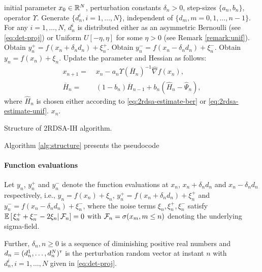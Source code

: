 \documentclass[letterpaper, 10 pt, conference]{ieeeconf}  %
\begin{document}
\begin{algorithm}[t]
\begin{algorithmic}
initial parameter $x_0 \in \mathbb{R}^N$, perturbation constants $\delta_n>0$, step-sizes $\{a_n, b_n\}$, operator $\Upsilon$.
	\State Generate $\{d_n^{i}, i=1,\ldots,N\}$, independent of $\{d_m, m=0,1,\ldots,n-1\}$. 
	\State For any $i=1,\ldots,N$, $d_n^{i}$ is distributed either as an asymmetric Bernoulli (see \eqref{eq:det-proj}) or Uniform $U[-\eta,\eta]$ for some $\eta >0$ (see Remark \ref{remark:unif}). 
	\PEval
	    \State Obtain $y_n^+ = f(x_n+\delta_n d_n) + \xi_n^+$.
  \EndPEval
	    \PEvalPrime
	    \State Obtain $y_n^- = f(x_n-\delta_n d_n) + \xi_n^-$.
	    \EndPEvalPrime
	    	    \PEvalPrimeDouble
	    \State Obtain $y_n = f(x_n) + \xi_n$.
	    \EndPEvalPrimeDouble
	    \PImpNewton
		\State Update the parameter and Hessian as follows:
		\begin{align*}
		x_{n+1} = & \; x_n - a_n \Upsilon(\overline H_n)^{-1}\widehat\nabla f(x_n), \\
\overline H_n = &\; (1-b_{n})  \overline H_{n-1} + b_{n} ( \widehat H_n - \widehat \Psi_n),
\end{align*}
where $\widehat H_n$ is chosen either according to \eqref{eq:2rdsa-estimate-ber} or \eqref{eq:2rdsa-estimate-unif}.
		\EndPImpNewton
\EndFor
{} $x_n.$
\end{algorithmic}
\caption{Structure of 2RDSA-IH algorithm.}
\label{alg:structure}
\end{algorithm}

Algorithm \ref{alg:structure} presents the pseudocode
\paragraph{\textbf{Function evaluations}}
Let $y_n$, $y_n^+$ and $y_n^-$ denote the function evaluations at $x_n$, $x_n+\delta_n d_n$ and $x_n - \delta_n d_n$ respectively, i.e., 
$y_n = f(x_n) + \xi_n$, $y_n^+ = f(x_n+\delta_n d_n) + \xi_n^+$ and 
$y_n^- = f(x_n-\delta_n d_n) + \xi_n^-$,
where the noise terms $\xi_n, \xi_n^+, \xi_n^-$ satisfy $\mathbb{E}\left[\left.\xi_n^+ + \xi_n^- - 2\xi_n \right| \mathcal{F}_n\right] = 0$ with $\mathcal{F}_n = \sigma(x_m,m\le n)$ denoting the underlying sigma-field.

Further, $\delta_n, n\geq 0$ is a sequence of diminishing positive real numbers and $d_n = (d_n^1,\ldots,d_n^N)^\mathsf{\scriptscriptstyle T}$ is the perturbation random vector at instant $n$ with $d_n^i,i=1,\ldots,N$ given in \eqref{eq:det-proj}.  
\end{document}
